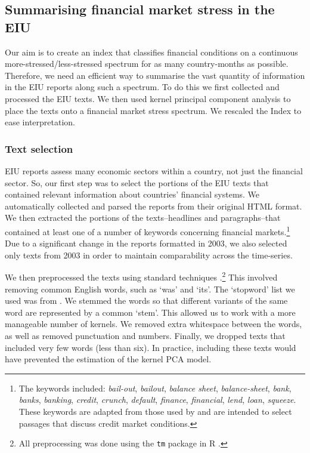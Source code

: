 \documentclass[]{article}
\begin{document}
\subsection{Summarising financial market stress in the
EIU}\label{summarizing-financial-market-stress-in-the-eiu}

Our aim is to create an index that classifies financial conditions on a continuous more-stressed/less-stressed spectrum for as many country-months as possible. Therefore, we need an efficient way to summarise the vast quantity of information in the EIU reports along such a spectrum. To do this we first collected and processed the EIU texts. We then used kernel principal component analysis to place the texts onto a
financial market stress spectrum. We rescaled the Index to ease interpretation.

\subsubsection{Text selection}\label{text-selection}

EIU reports assess many economic sectors within a country,
not just the financial sector. So, our first step was to select the portions of the EIU texts that contained relevant information about countries' financial systems. We automatically collected and parsed the reports from their original HTML format. We then extracted the portions of the texts--headlines and paragraphs--that contained at least one of a number of keywords concerning financial markets.\footnote{The
  keywords included: \emph{bail-out}, \emph{bailout}, \emph{balance
  sheet}, \emph{balance-sheet}, \emph{bank}, \emph{banks},
  \emph{banking}, \emph{credit}, \emph{crunch}, \emph{default},
  \emph{finance}, \emph{financial}, \emph{lend}, \emph{loan},
  \emph{squeeze}. These keywords are adapted
  from those used by \cite{Romer2015} and are intended to
  select passages that discuss credit market conditions.} Due to a significant change in the reports formatted in 2003, we also
selected only texts from 2003 in order to maintain comparability across the time-series.

We then preprocessed the texts using standard techniques \citep[see][]{Grimmer2013}.\footnote{All preprocessing was done using the \texttt{tm} package \citep{tm2015} in R \citep{R-cite}.} This involved removing common English words, such as `was' and `its'. The `stopword' list we used was from \cite{dhillon:modha:mlj01}. We stemmed the words so that different variants of the same word are represented by a common `stem'. This allowed us to work with a more manageable number of kernels.  We removed extra whitespace between the words, as well as removed punctuation and numbers. Finally, we dropped texts that included very few words (less than six). In practice, including these texts would have prevented the estimation of the kernel PCA model.
\end{document}
